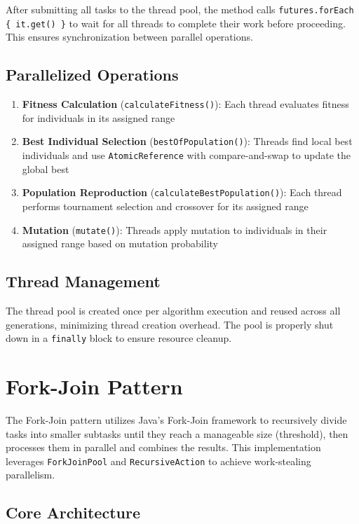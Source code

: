 After submitting all tasks to the thread pool, the method calls
\texttt{futures.forEach \{ it.get() \}} to wait for all threads to complete
their work before proceeding. This ensures synchronization between parallel
operations.

\subsection{Parallelized Operations}\label{sec:scatter-gather-operations}

\begin{enumerate}
    \item \textbf{Fitness Calculation} (\texttt{calculateFitness()}): Each
    thread evaluates fitness for individuals in its assigned range
    \item \textbf{Best Individual Selection} (\texttt{bestOfPopulation()}):
    Threads find local best individuals and use \texttt{AtomicReference} with
    compare-and-swap to update the global best
    \item \textbf{Population Reproduction} (\texttt{calculateBestPopulation()}):
    Each thread performs tournament selection and crossover for its assigned
    range
    \item \textbf{Mutation} (\texttt{mutate()}): Threads apply mutation to
    individuals in their assigned range based on mutation probability
\end{enumerate}

\subsection{Thread Management}
The thread pool is created once per algorithm execution and reused across all
generations, minimizing thread creation overhead. The pool is properly shut down
in a \texttt{finally} block to ensure resource cleanup.

\section{Fork-Join Pattern}

The Fork-Join pattern utilizes Java's Fork-Join framework to recursively divide
tasks into smaller subtasks until they reach a manageable size (threshold), then
processes them in parallel and combines the results. This implementation
leverages \texttt{ForkJoinPool} and \texttt{RecursiveAction} to achieve
work-stealing parallelism.

\subsection{Core Architecture}

